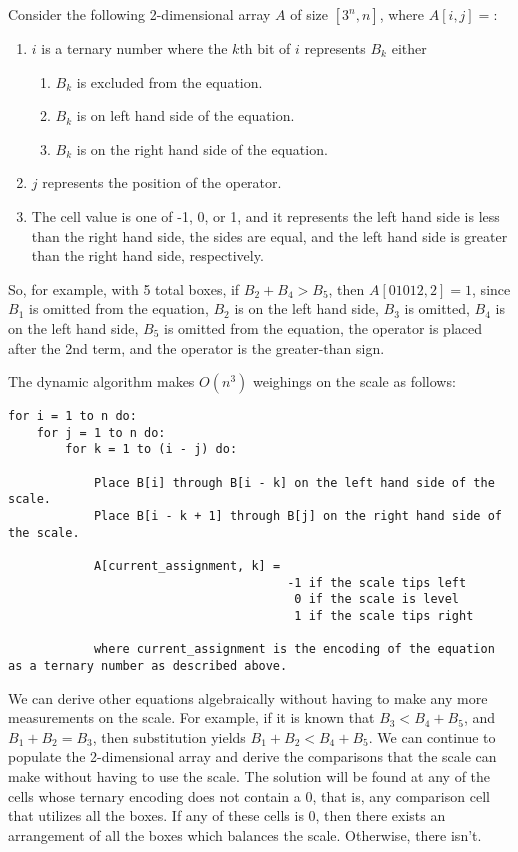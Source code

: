 \documentclass[letterpaper,notitlepage,twoside]{article}
\begin{document}
Consider the following 2-dimensional array $A$ of size $[3^n, n]$, where $A[i, j] = $:
\begin{enumerate}
\item $i$ is a ternary number where the $k$th bit of $i$ represents $B_k$ either
    \begin{enumerate}
    \setcounter{enumi}{0}
    \item $B_k$ is excluded from the equation.
    \item $B_k$ is on left hand side of the equation.
    \item $B_k$ is on the right hand side of the equation.
    \end{enumerate}
\item $j$ represents the position of the operator.
\item The cell value is one of -1, 0, or 1, and it represents the left hand side is less than the right hand side, the sides are equal, and the left hand side is greater than the right hand side, respectively.
\end{enumerate}
So, for example, with 5 total boxes, if $B_2 + B_4 > B_5$, then $A[01012, 2] = 1$, since $B_1$ is omitted from the equation, $B_2$ is on the left hand side, $B_3$ is omitted, $B_4$ is on the left hand side, $B_5$ is omitted from the equation, the operator is placed after the 2nd term, and the operator is the greater-than sign.

The dynamic algorithm makes $O(n^3)$ weighings on the scale as follows:
\begin{verbatim}
for i = 1 to n do:
    for j = 1 to n do:
        for k = 1 to (i - j) do:
        
            Place B[i] through B[i - k] on the left hand side of the scale.
            Place B[i - k + 1] through B[j] on the right hand side of the scale.
            
            A[current_assignment, k] =
                                       -1 if the scale tips left
                                        0 if the scale is level
                                        1 if the scale tips right
                                        
            where current_assignment is the encoding of the equation as a ternary number as described above.
\end{verbatim}

We can derive other equations algebraically without having to make any more measurements on the scale. For example, if it is known that $B_3 < B_4 + B_5$, and $B_1 + B_2 = B_3$, then substitution yields $B_1 + B_2 < B_4 + B_5$. We can continue to populate the 2-dimensional array and derive the comparisons that the scale can make without having to use the scale. The solution will be found at any of the cells whose ternary encoding does not contain a 0, that is, any comparison cell that utilizes all the boxes. If any of these cells is 0, then there exists an arrangement of all the boxes which balances the scale. Otherwise, there isn't.
\end{document}
